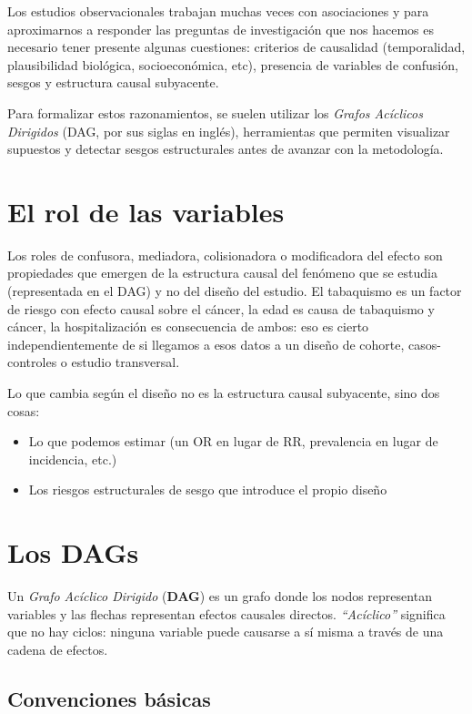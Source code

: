 \documentclass[
  spanish,
  a4paper,
]{scrbook}
\providecommand{\tightlist}{%
  \setlength{\itemsep}{0pt}\setlength{\parskip}{0pt}}
\begin{document}
Los estudios observacionales trabajan muchas veces con asociaciones y
para aproximarnos a responder las preguntas de investigación que nos
hacemos es necesario tener presente algunas cuestiones: criterios de
causalidad (temporalidad, plausibilidad biológica, socioeconómica, etc),
presencia de variables de confusión, sesgos y estructura causal
subyacente.

Para formalizar estos razonamientos, se suelen utilizar los \emph{Grafos
Acíclicos Dirigidos} (DAG, por sus siglas en inglés), herramientas que
permiten visualizar supuestos y detectar sesgos estructurales antes de
avanzar con la metodología.

\section{El rol de las variables}\label{el-rol-de-las-variables}

Los roles de confusora, mediadora, colisionadora o modificadora del
efecto son propiedades que emergen de la estructura causal del fenómeno
que se estudia (representada en el DAG) y no del diseño del estudio. El
tabaquismo es un factor de riesgo con efecto causal sobre el cáncer, la
edad es causa de tabaquismo y cáncer, la hospitalización es consecuencia
de ambos: eso es cierto independientemente de si llegamos a esos datos a
un diseño de cohorte, casos-controles o estudio transversal.

Lo que cambia según el diseño no es la estructura causal subyacente,
sino dos cosas:

\begin{itemize}
\tightlist
\item
  Lo que podemos estimar (un OR en lugar de RR, prevalencia en lugar de
  incidencia, etc.)
\item
  Los riesgos estructurales de sesgo que introduce el propio diseño
\end{itemize}

\section{Los DAGs}\label{los-dags}

Un \emph{Grafo Acíclico Dirigido} (\textbf{DAG}) es un grafo donde los
nodos representan variables y las flechas representan efectos causales
directos. \emph{``Acíclico''} significa que no hay ciclos: ninguna
variable puede causarse a sí misma a través de una cadena de efectos.

\subsection{Convenciones básicas}\label{convenciones-buxe1sicas}
\end{document}
